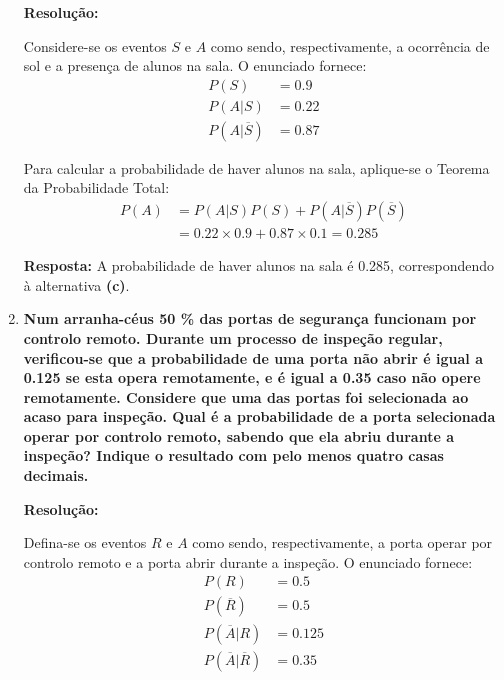 \documentclass[a4paper,12pt]{article}
\begin{document}
\begin{enumerate}
  \vspace{0.3cm}
  
  \begin{mdframed}[backgroundcolor=gray!10, linewidth=0pt, innertopmargin=10pt, innerbottommargin=10pt]
  \textbf{Resolução:}
  
  Considere-se os eventos $S$ e $A$ como sendo, respectivamente, a ocorrência de sol e a presença de alunos na sala. O enunciado fornece:
  \begin{align*}
    P(S) &= 0.9 \\
    P(A|S) &= 0.22 \\
    P(A|\overline{S}) &= 0.87
  \end{align*}
  
  Para calcular a probabilidade de haver alunos na sala, aplique-se o Teorema da Probabilidade Total:
  \begin{align*}
    P(A) &= P(A|S)P(S) + P(A|\overline{S})P(\overline{S}) \\
    &= 0.22 \times 0.9 + 0.87 \times 0.1 = 0.285
  \end{align*}
  
  \textbf{Resposta:} A probabilidade de haver alunos na sala é 0.285, correspondendo à alternativa \textbf{(c)}.
  \end{mdframed}

  \vspace{0.5cm}
  
  \item \textbf{Num arranha-céus 50 \% das portas de segurança funcionam por controlo remoto. Durante um processo de inspeção regular, verificou-se que a probabilidade de uma porta não abrir é igual a 0.125 se esta opera remotamente, e é igual a 0.35 caso não opere remotamente.
  Considere que uma das portas foi selecionada ao acaso para inspeção. Qual é a probabilidade de a porta selecionada operar por controlo remoto, sabendo que ela abriu durante a inspeção?
  Indique o resultado com pelo menos quatro casas decimais.}
  
  \vspace{0.3cm}
  
  \begin{mdframed}[backgroundcolor=gray!10, linewidth=0pt, innertopmargin=10pt, innerbottommargin=10pt]
  \textbf{Resolução:}
  
  Defina-se os eventos $R$ e $A$ como sendo, respectivamente, a porta operar por controlo remoto e a porta abrir durante a inspeção. O enunciado fornece:
  \begin{align*}
    P(R) &= 0.5 \\
    P(\overline{R}) &= 0.5 \\
    P(\overline{A}|R) &= 0.125 \\
    P(\overline{A}|\overline{R}) &= 0.35
  \end{align*}
  

\end{mdframed}
\end{enumerate}
\end{document}
